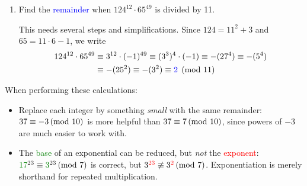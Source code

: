 \begin{examples}{}{}
\begin{enumerate}
	  \item Find the \textcolor{blue}{remainder} when $124^{12}\cdot 65^{49}$ is divided by 11.\par
	  This needs several steps and simplifications. Since $124=11^2+3$ and $65=11\cdot 6-1$, we write
	  \begin{align*}
	  	124^{12}\cdot 65^{49}&\equiv 3^{12}\cdot(-1)^{49}\equiv (3^3)^4\cdot (-1) \equiv -(27^4)\equiv -(5^4)\\
	  	&\equiv -(25^2)\equiv -(3^2)\equiv \textcolor{blue}{2}\pmod{11}
	  \end{align*}
	\end{enumerate}
\end{examples}


When performing these calculations:
\begin{itemize}
  \item Replace each integer by something \emph{small} with the same remainder: $37\equiv -3\negthickspace\pmod{10}$ is more helpful than $37\equiv 7\negthickspace\pmod{10}$, since powers of $-3$ are much easier to work with.
  \item The \textcolor{Green}{base} of an exponential can be reduced, but \emph{not} the \textcolor{red}{exponent}: $\textcolor{Green}{17}^{23}\equiv \textcolor{Green}{3}^{23}\spmod 7$ is correct, but $3^{\textcolor{red}{23}}\not\equiv 3^{\textcolor{red}{2}}\negthickspace\pmod{7}$. Exponentiation is merely shorthand for repeated multiplication.
\end{itemize}



